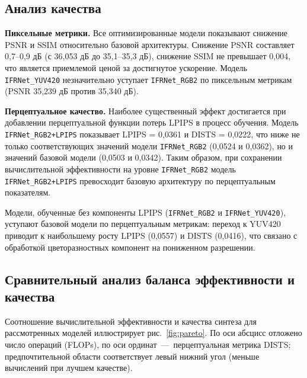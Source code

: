 \subsection*{Анализ качества}

\textbf{Пиксельные метрики.} Все оптимизированные модели показывают снижение PSNR и SSIM относительно базовой архитектуры. Снижение PSNR составляет 0,7--0,9 дБ (с 36,053 дБ до 35,1--35,3 дБ), снижение SSIM не превышает 0,004, что является приемлемой ценой за достигнутое ускорение. Модель \texttt{IFRNet\_YUV420} незначительно уступает \texttt{IFRNet\_RGB2} по пиксельным метрикам (PSNR 35,239 дБ против 35,340 дБ).

\textbf{Перцептуальное качество.} Наиболее существенный эффект достигается при добавлении перцептуальной функции потерь LPIPS в процесс обучения. Модель \texttt{IFRNet\_RGB2+LPIPS} показывает LPIPS = 0,0361 и DISTS = 0,0222, что ниже не только соответствующих значений модели \texttt{IFRNet\_RGB2} (0,0524 и 0,0362), но и значений базовой модели (0,0503 и 0,0342). Таким образом, при сохранении вычислительной эффективности на уровне \texttt{IFRNet\_RGB2} модель \texttt{IFRNet\_RGB2+LPIPS} превосходит базовую архитектуру по перцептуальным показателям.

Модели, обученные без компоненты LPIPS (\texttt{IFRNet\_RGB2} и \texttt{IFRNet\_YUV420}), уступают базовой модели по перцептуальным метрикам: переход к YUV420 приводит к наибольшему росту LPIPS (0,0557) и DISTS (0,0416), что связано с обработкой цветоразностных компонент на пониженном разрешении.

\subsection*{Сравнительный анализ баланса эффективности и качества}

Соотношение вычислительной эффективности и качества синтеза для рассмотренных моделей иллюстрирует рис.~\ref{fig:pareto}. По оси абсцисс отложено число операций (FLOPs), по оси ординат~---~перцептуальная метрика DISTS; предпочтительной области соответствует левый нижний угол (меньше вычислений при лучшем качестве).

